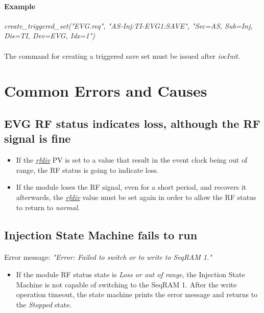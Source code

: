 \documentclass[openany]{article}
\begin{document}
			\paragraph{Example} \emph{create\_triggered\_set("EVG.req", "AS-Inj:TI-EVG1:SAVE", "Sec=AS, Sub=Inj, Dis=TI, Dev=EVG, Idx=1")}

			\paragraph{} {\color{red}The command for creating a triggered save set must be issued after \emph{iocInit}.}

\section{Common Errors and Causes}\label{sec:common-error-causes}

	\subsection{EVG RF status indicates loss, although the RF signal is fine}

		\begin{itemize}
		\item If the \hyperref[pvgroup:evg-configuration]{\emph{rfdiv}} PV is set to a value that result in the event clock being out of range, the RF status is going to indicate loss.
		\item If the module loses the RF signal, even for a short period, and recovers it afterwards, the \hyperref[pvgroup:evg-configuration]{\emph{rfdiv}} value must be set again in order to allow the RF status to return to \emph{normal}.
		\end{itemize}

	\subsection{Injection State Machine fails to run}

		\paragraph{} Error message: \emph{"Error: Failed to switch or to write to SeqRAM 1."}

		\begin{itemize}
		\item If the module RF status state is \emph{Loss or out of range}, the Injection State Machine is not capable of switching to the SeqRAM 1. After the write operation timeout, the state machine prints the error message and returns to the \emph{Stopped} state.
		\end{itemize}
\end{document}
